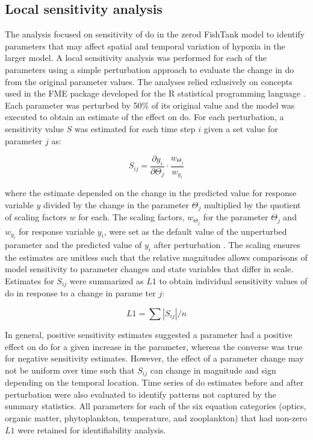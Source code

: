 \documentclass[letterpaper,12pt,oneside]{article}\usepackage[]{graphicx}\usepackage[]{color}
\begin{document}
\subsection{Local sensitivity analysis}

The analysis focused on sensitivity of \ac{do} in the \ac{zerod} FishTank model to identify parameters that may affect spatial and temporal variation of hypoxia in the larger model.  A local sensitivity analysis was performed for each of the parameters using a simple perturbation approach to evaluate the change in \ac{do} from the original parameter values.  The analyses relied exlusively on concepts used in the FME package developed for the R statistical programming language \citep{Soetaert10}. Each parameter was perturbed by 50\% of its original value and the model was executed to obtain an estimate of the effect on \ac{do}.  For each perturbation, a sensitivity value $S$ was estimated for each time step $i$ given a set value for parameter $j$ as:

\begin{equation} \label{sijeqn}
S_{ij} = \frac{\partial y_i}{\partial \Theta_j}\cdot\frac{w_{\Theta_j}}{w_{y_i}}
\end{equation}

\noindent where the estimate depended on the change in the predicted value for response variable $y$ divided by the change in the parameter $\Theta_j$ multiplied by the quotient of scaling factors $w$ for each.  The scaling factors, $w_{\Theta_j}$ for the parameter $\Theta_j$ and $w_{y_i}$ for response variable $y_i$, were set as the default value of the unperturbed parameter and the predicted value of $y_i$ after perturbation \citep{Soetaert10}.  The scaling ensures the estimates are unitless such that the relative magnitudes allows comparisons of model sensitivity to parameter changes and state variables that differ in scale.  Estimates for $S_{ij}$ were summarized as $L1$ to obtain individual sensitivity values of \ac{do} in response to a change in parame ter $j$:

\begin{equation} \label{l1}
L1 = \sum|S_{ij}|/n
\end{equation}

In general, positive sensitivity estimates suggested a parameter had a positive effect on \ac{do} for a given increase in the parameter, whereas the converse was true for negative sensitivity estimates.  However, the effect of a parameter change may not be uniform over time such that $S_{ij}$ can change in magnitude and sign depending on the temporal location.  Time series of \ac{do} estimates before and after perturbation were also evaluated to identify patterns not captured by the summary statistics. All parameters for each of the six equation categories (optics, organic matter, phytoplankton, temperature, and zooplankton) that had non-zero $L1$ were retained for identifiability analysis.  
\end{document}
